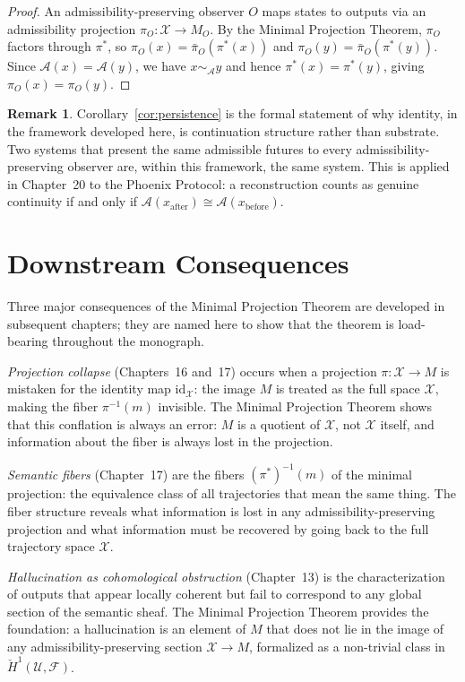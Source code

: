 \documentclass[12pt, oneside]{book}
\theoremstyle{flyxion}
\theoremstyle{definition}
\newtheorem{remark}[theorem]{Remark}
\begin{document}
\begin{proof}
An admissibility-preserving observer $O$ maps states to outputs
via an admissibility projection $\pi_O : \mathcal{X} \to M_O$.
By the Minimal Projection Theorem, $\pi_O$ factors through
$\pi^*$, so $\pi_O(x) = \bar\pi_O(\pi^*(x))$ and
$\pi_O(y) = \bar\pi_O(\pi^*(y))$. Since
$\mathcal{A}(x) = \mathcal{A}(y)$, we have $x \sim_{\mathcal{A}} y$
and hence $\pi^*(x) = \pi^*(y)$, giving
$\pi_O(x) = \pi_O(y)$.
\end{proof}

\begin{remark}
Corollary~\ref{cor:persistence} is the formal statement of why
identity, in the framework developed here, is continuation
structure rather than substrate. Two systems that present the
same admissible futures to every admissibility-preserving
observer are, within this framework, the same system. This
is applied in Chapter~20 to the Phoenix Protocol: a
reconstruction counts as genuine continuity if and only if
$\mathcal{A}(x_\mathrm{after}) \cong \mathcal{A}(x_\mathrm{before})$.
\end{remark}

\section{Downstream Consequences}

Three major consequences of the Minimal Projection Theorem
are developed in subsequent chapters; they are named here
to show that the theorem is load-bearing throughout the
monograph.

\textit{Projection collapse} (Chapters~16 and~17) occurs
when a projection $\pi : \mathcal{X} \to M$ is mistaken
for the identity map $\mathrm{id}_{\mathcal{X}}$: the
image $M$ is treated as the full space $\mathcal{X}$,
making the fiber $\pi^{-1}(m)$ invisible. The Minimal
Projection Theorem shows that this conflation is always
an error: $M$ is a quotient of $\mathcal{X}$, not
$\mathcal{X}$ itself, and information about the fiber
is always lost in the projection.

\textit{Semantic fibers} (Chapter~17) are the fibers
$(\pi^*)^{-1}(m)$ of the minimal projection: the
equivalence class of all trajectories that mean the
same thing. The fiber structure reveals what information
is lost in any admissibility-preserving projection and
what information must be recovered by going back to the
full trajectory space $\mathcal{X}$.

\textit{Hallucination as cohomological obstruction}
(Chapter~13) is the characterization of outputs that
appear locally coherent but fail to correspond to any
global section of the semantic sheaf. The Minimal
Projection Theorem provides the foundation: a
hallucination is an element of $M$ that does not lie
in the image of any admissibility-preserving section
$\mathcal{X} \to M$, formalized as a non-trivial
class in $\check{H}^1(\mathcal{U}, \mathcal{F})$.
\end{document}
